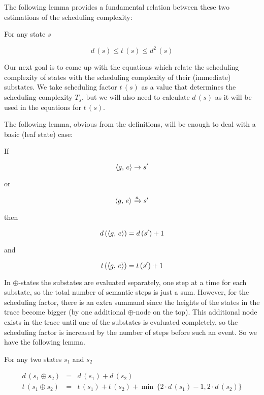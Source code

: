 The following lemma provides a fundamental relation between these two estimations of the scheduling complexity:

\begin{lemma}
  For any state $s$

  \[
  d\,(s) \le t\,(s) \le d^2\,(s)
  \]
  
\end{lemma}

Our next goal is to come up with the equations which relate the scheduling complexity of states with the scheduling complexity of their
(immediate) substates. We take scheduling factor $t\,(s)$ as a value that determines the scheduling complexity $T_s$, but we will also need to calculate $d\,(s)$ as it will be used in the equations for $t\,(s)$. 

The following lemma, obvious from the definitions, will be enough to deal with a basic (leaf state) case:

\begin{lemma}
  If

  \[\langle g ,\, e \rangle \rightarrow s^\prime\]

  or

  \[\langle g ,\, e \rangle \xrightarrow{a} s^\prime\]

  then

  \[d\,(\langle g ,\, e \rangle) = d\,(s^\prime) + 1\]

  and

  \[t\,(\langle g ,\, e \rangle) = t\,(s^\prime) + 1\]
\end{lemma}

In $\oplus$-states the substates are evaluated separately, one step at a time for each substate, so the total number of semantic steps is just a sum. However, for the scheduling factor, there is an
extra summand since the heights of the states in the trace become bigger (by one additional $\oplus$-node on the top). This additional node exists in the trace until one of the substates is
evaluated completely, so the scheduling factor is increased by the number of steps before such an event. So we have the following lemma.

\begin{lemma}
\label{lem:sum_estimation}
For any two states $s_1$ and $s_2$

\[
\begin{array}{rcl}
  d\,(s_1 \oplus s_2) &=& d\,(s_1) + d\,(s_2) \\

  t\,(s_1 \oplus s_2) &=& t\,(s_1) + t\,(s_2) + \min\,\{2\cdot d\,(s_1) - 1, 2\cdot d\,(s_2)\}
\end{array}
\]

\end{lemma}

